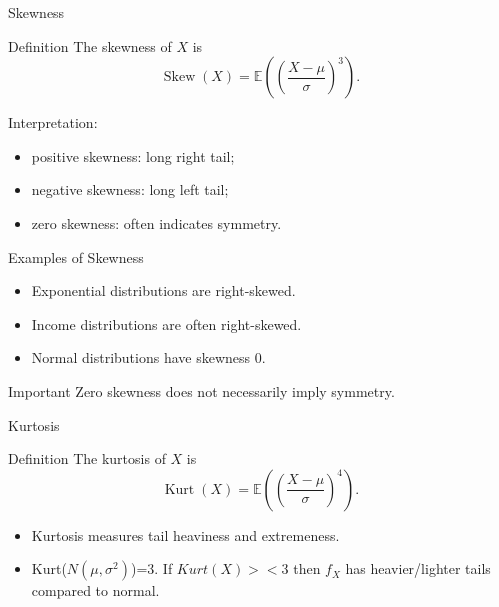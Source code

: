 \begin{frame}{Skewness}
\begin{keybox}{Definition}
The skewness of $X$ is
\[
\boxed{
\operatorname{Skew}(X)
=
\mathbb{E}
\left(
\left(
\frac{X-\mu}{\sigma}
\right)^3
\right).
}
\]
\end{keybox}

\vspace{0.25cm}

Interpretation:
\begin{itemize}
    \item positive skewness:
    long right tail;

    \item negative skewness:
    long left tail;

    \item zero skewness:
    often indicates symmetry.
\end{itemize}
\end{frame}

\begin{frame}{Examples of Skewness}
\begin{itemize}
    \item Exponential distributions are right-skewed.
    \item Income distributions are often right-skewed.
    \item Normal distributions have skewness $0$.
\end{itemize}

\vspace{0.25cm}

\begin{keybox}{Important}
Zero skewness does not necessarily imply symmetry.
\end{keybox}
\end{frame}

\begin{frame}{Kurtosis}
\begin{keybox}{Definition}
The kurtosis of $X$ is
\[
\boxed{
\operatorname{Kurt}(X)
=
\mathbb{E}
\left(
\left(
\frac{X-\mu}{\sigma}
\right)^4
\right).
}
\]
\end{keybox}


\begin{itemize}
    \item Kurtosis measures tail heaviness and extremeness.


\item Kurt($N(\mu,\sigma^2)$)=3. If $Kurt(X)><3$ then $f_X$ has heavier/lighter tails compared to normal.

\end{itemize}

\end{frame}


